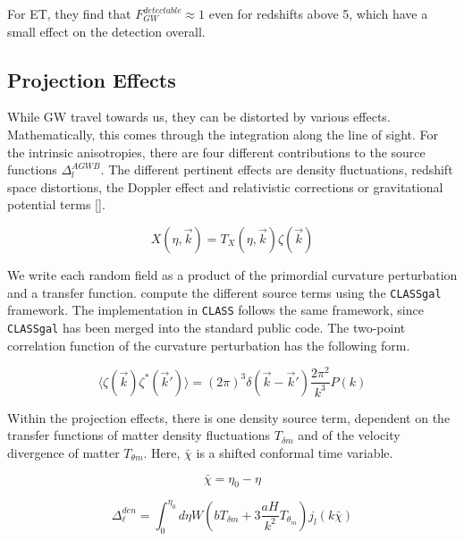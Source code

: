 For ET, they find that $F_{GW}^{detectable} \approx 1$ even for redshifts above 5, which have a small effect on the detection overall. 

\subsection{Projection Effects}
\label{projection_effects}

While GW travel towards us, they can be distorted by various effects. Mathematically, this comes through the integration along the line of sight.
For the intrinsic anisotropies, there are four different contributions to the source functions $\Delta_l^{AGWB}$. The different pertinent effects are density fluctuations, redshift space distortions, the Doppler effect and relativistic corrections or gravitational potential terms [\cite{di_dio_classgal_2013}].


\begin{equation}
    X(\eta, \vec{k}) = T_X(\eta, \vec{k})\zeta(\vec{k})
\end{equation}

We write each random field as a product of the primordial curvature perturbation and a transfer function. \cite{dallarmi_dipole_2022} compute the different source terms using the {\tt CLASSgal} framework. The implementation in {\tt CLASS} follows the same framework, since {\tt CLASSgal} has been merged into the standard public code. The two-point correlation function of the curvature perturbation has the following form.

\begin{equation}
    \langle \zeta(\vec{k})\zeta^*(\vec{k}')\rangle = (2\pi)^3 \delta(\vec{k}-\vec{k}')\frac{2\pi^2}{k^3}P(k)
\end{equation}

Within the projection effects, there is one density source term, dependent on the transfer functions of matter density fluctuations $T_{\delta m}$ and of the velocity divergence of matter $T_{\theta m}$. Here, $\bar{\chi}$ is a shifted conformal time variable.

\begin{equation}
    \bar{\chi} = \eta_0 - \eta 
\end{equation}


\begin{equation}
    \Delta_\ell^{den}=\int_0^{\eta_0} d\eta W \left(b T_{\delta m} +3 \frac{aH}{k^2} T_{\theta_m}\right)j_l(k \bar{\chi})
\end{equation}

